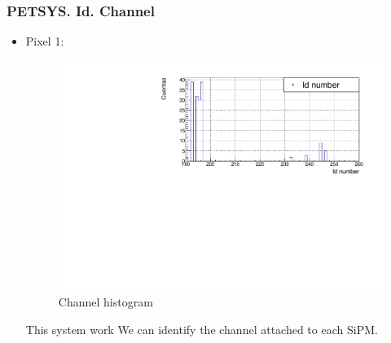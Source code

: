 \documentclass{beamer}
\begin{document}
\begin{frame}
\frametitle{PETSYS. Id. Channel}
\begin{itemize}
\item{} Pixel 1:

\begin{figure}[hbtp]
\centering
\includegraphics[scale=0.35]{PETSYS/Id_channel/Channel_pixel_1.pdf}
\caption{Channel histogram}
\end{figure}

\begin{block}{This system work}
We can identify the channel attached to each SiPM.
\end{block}

\end{itemize}

\end{frame}
\end{document}
